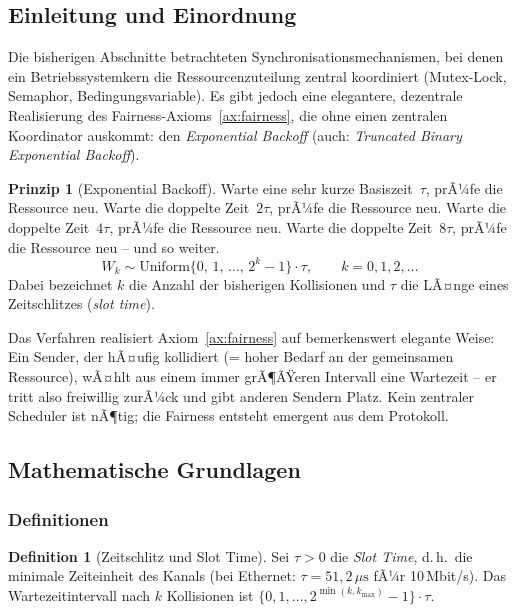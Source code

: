 ﻿\documentclass[a4paper,12pt]{article}
\theoremstyle{definition}
\newtheorem{definition}{Definition}
\newtheorem{prinzip}{Prinzip}
\begin{document}
\subsection{Einleitung und Einordnung}

Die bisherigen Abschnitte betrachteten Synchronisationsmechanismen, bei
denen ein Betriebssystemkern die Ressourcenzuteilung zentral koordiniert
(Mutex-Lock, Semaphor, Bedingungsvariable). Es gibt jedoch eine
elegantere, dezentrale Realisierung des Fairness-Axioms~\ref{ax:fairness},
die ohne einen zentralen Koordinator auskommt: den
\emph{Exponential Backoff} (auch: \emph{Truncated Binary Exponential
Backoff}).

\begin{prinzip}[Exponential Backoff]
\label{prinzip:backoff}
Warte eine sehr kurze Basiszeit~$\tau$, prÃ¼fe die Ressource neu.
Warte die doppelte Zeit~$2\tau$, prÃ¼fe die Ressource neu.
Warte die doppelte Zeit~$4\tau$, prÃ¼fe die Ressource neu.
Warte die doppelte Zeit~$8\tau$, prÃ¼fe die Ressource neu -- und so weiter.
\[
  W_k \sim \mathrm{Uniform}\bigl\{0,\, 1,\, \ldots,\, 2^k - 1\bigr\} \cdot \tau,
  \qquad k = 0, 1, 2, \ldots
\]
Dabei bezeichnet $k$ die Anzahl der bisherigen Kollisionen und $\tau$ die
LÃ¤nge eines Zeitschlitzes (\emph{slot time}).
\end{prinzip}

Das Verfahren realisiert Axiom~\ref{ax:fairness} auf bemerkenswert
elegante Weise: Ein Sender, der hÃ¤ufig kollidiert (= hoher Bedarf an
der gemeinsamen Ressource), wÃ¤hlt aus einem immer grÃ¶ÃŸeren Intervall
eine Wartezeit -- er tritt also freiwillig zurÃ¼ck und gibt anderen
Sendern Platz. Kein zentraler Scheduler ist nÃ¶tig; die Fairness entsteht
emergent aus dem Protokoll.

\subsection{Mathematische Grundlagen}

\subsubsection{Definitionen}

\begin{definition}[Zeitschlitz und Slot Time]
Sei $\tau > 0$ die \emph{Slot Time}, d.\,h.\ die minimale Zeiteinheit
des Kanals (bei Ethernet: $\tau = 51{,}2\,\mu\mathrm{s}$ fÃ¼r
10\,Mbit/s). Das Wartezeitintervall nach $k$ Kollisionen ist
$\{0, 1, \ldots, 2^{\min(k, k_{\max})} - 1\} \cdot \tau$.
\end{definition}
\end{document}
